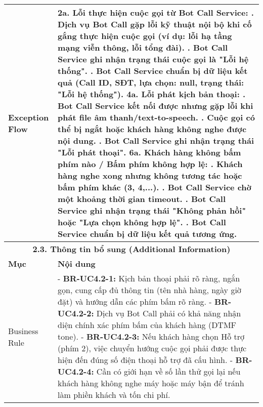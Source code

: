 \begin{longtable}{|m{4cm}|p{11cm}|}
\hline
Exception Flow & \textbf{2a. Lỗi thực hiện cuộc gọi từ Bot Call Service:} \newline    1. Dịch vụ Bot Call gặp lỗi kỹ thuật nội bộ khi cố gắng thực hiện cuộc gọi (ví dụ: lỗi hạ tầng mạng viễn thông, lỗi tổng đài). \newline    2. Bot Call Service ghi nhận trạng thái cuộc gọi là "Lỗi hệ thống". \newline    3. Bot Call Service chuẩn bị dữ liệu kết quả (Call ID, SĐT, lựa chọn: null, trạng thái: "Lỗi hệ thống"). \newline \textbf{4a. Lỗi phát kịch bản thoại:} \newline    1. Bot Call Service kết nối được nhưng gặp lỗi khi phát file âm thanh/text-to-speech. \newline    2. Cuộc gọi có thể bị ngắt hoặc khách hàng không nghe được nội dung. \newline    3. Bot Call Service ghi nhận trạng thái "Lỗi phát thoại". \newline \textbf{6a. Khách hàng không bấm phím nào / Bấm phím không hợp lệ:} \newline    1. Khách hàng nghe xong nhưng không tương tác hoặc bấm phím khác (3, 4,...). \newline    2. Bot Call Service chờ một khoảng thời gian timeout. \newline    3. Bot Call Service ghi nhận trạng thái "Không phản hồi" hoặc "Lựa chọn không hợp lệ". \newline    4. Bot Call Service chuẩn bị dữ liệu kết quả tương ứng. \\
\hline
\multicolumn{2}{|c|}{\textbf{2.3. Thông tin bổ sung (Additional Information)}} \\
\hline
\textbf{Mục} & \textbf{Nội dung} \\
\hline
Business Rule & - \textbf{BR-UC4.2-1:} Kịch bản thoại phải rõ ràng, ngắn gọn, cung cấp đủ thông tin (tên nhà hàng, ngày giờ đặt) và hướng dẫn các phím bấm rõ ràng. \newline - \textbf{BR-UC4.2-2:} Dịch vụ Bot Call phải có khả năng nhận diện chính xác phím bấm của khách hàng (DTMF tone). \newline - \textbf{BR-UC4.2-3:} Nếu khách hàng chọn Hỗ trợ (phím 2), việc chuyển hướng cuộc gọi phải được thực hiện đến đúng số điện thoại hỗ trợ đã cấu hình. \newline - \textbf{BR-UC4.2-4:} Cần có giới hạn về số lần thử gọi lại nếu khách hàng không nghe máy hoặc máy bận để tránh làm phiền khách và tốn chi phí. \\

\end{longtable}
